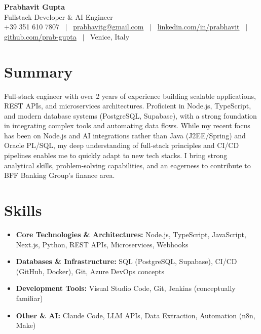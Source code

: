 \documentclass[a4paper,10pt]{article}
\begin{document}
\begin{center}
 {\Huge\bfseries Prabhavit Gupta}\\[3pt]
 {\color{accent}\large Fullstack Developer \& AI Engineer}\\[6pt]
 {\footnotesize +39 351 610 7807 ~$\vert$~
 \href{mailto:prabhavitg@gmail.com}{prabhavitg@gmail.com} ~$\vert$~
 \href{https://www.linkedin.com/in/prabhavit/}{linkedin.com/in/prabhavit} ~$\vert$~
 \href{https://github.com/prab-gupta}{github.com/prab-gupta} ~$\vert$~
 Venice, Italy}
\end{center}
\vspace{-2pt}

\section{Summary}
Full-stack engineer with over 2 years of experience building scalable applications, REST APIs, and microservices architectures. Proficient in Node.js, TypeScript, and modern database systems (PostgreSQL, Supabase), with a strong foundation in integrating complex tools and automating data flows. While my recent focus has been on Node.js and AI integrations rather than Java (J2EE/Spring) and Oracle PL/SQL, my deep understanding of full-stack principles and CI/CD pipelines enables me to quickly adapt to new tech stacks. I bring strong analytical skills, problem-solving capabilities, and an eagerness to contribute to BFF Banking Group's finance area.

\section{Skills}
\begin{itemize}
 \item \textbf{Core Technologies \& Architectures:} Node.js, TypeScript, JavaScript, Next.js, Python, REST APIs, Microservices, Webhooks
 \item \textbf{Databases \& Infrastructure:} SQL (PostgreSQL, Supabase), CI/CD (GitHub, Docker), Git, Azure DevOps concepts
 \item \textbf{Development Tools:} Visual Studio Code, Git, Jenkins (conceptually familiar)
 \item \textbf{Other \& AI:} Claude Code, LLM APIs, Data Extraction, Automation (n8n, Make)
\end{itemize}
\end{document}
